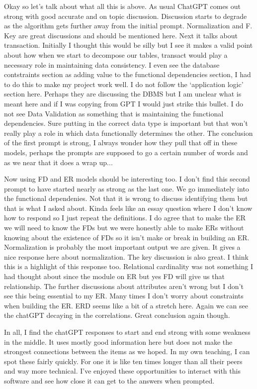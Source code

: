 \documentclass[11pt]{article}
\begin{document}
\begin{enumerate}
Okay so let's talk about what all this is above.  As usual ChatGPT comes out strong with good accurate and on topic discussion.  Discussion starts to degrade as the algorithm gets further away from the initial prompt.  Normalization and F. Key are great discussions and should be mentioned here.  Next it talks about transaction.  Initially I thought this would be silly but I see it makes a valid point about how when we start to decompose our tables, transact would play a necessary role in maintaining data consistency.  I even see the database contstraints section as adding value to the functional dependencies section, I had to do this to make my project work well.  I do not follow the `application logic' section here.  Perhaps they are discussing the DBMS but I am unclear what is meant here and if I was copying from GPT I would just strike this bullet.  I do not see Data Validation as something that is maintaining the functional dependencies.  Sure putting in the correct data type is important but that won't really play a role in which data functionally determines the other.  The conclusion of the first prompt is strong, I always wonder how they pull that off in these models, perhaps the prompts are supposed to go a certain number of words and as we near that it does a wrap up...  

Now using FD and ER models should be interesting too.   I don't find this second prompt to have started nearly as strong as the last one.  We go immediately into the functional dependenies.  Not that it is wrong to discuss identifying them but that is what I asked about.  Kinda feels like an essay question where I don't know how to respond so I just repeat the definitions.  I do agree that to make the ER we will need to know the FDs but we were honestly able to make ERs without knowing about the existence of FDs so it isn't make or break in building an ER.  Normalization is probably the most important output we are given.  It gives a nice response here about normalization.  The key discussion is also great.  I think this is a highlight of this response too.  Relational cardinality was not something I had thought about since the module on ER but yes FD will give us that relationship.  The further discussions about attributes aren't wrong but I don't see this being essential to my ER.  Many times I don't worry about constraints when building the ER.  ERD seems like a bit of a stretch here.  Again we can see the chatGPT decaying in the correlations.  Great conclusion again though.

In all, I find the chatGPT responses to start and end strong with some weakness in the middle.  It uses mostly good information here but does not make the strongest connections between the items as we hoped.  In my own teaching, I can spot these fairly quickly.  For one it is like ten times longer than all their peers and way more technical.  I've enjoyed these opportunities to interact with this software and see how close it can get to the answers when prompted.
\end{enumerate}
\end{document}
